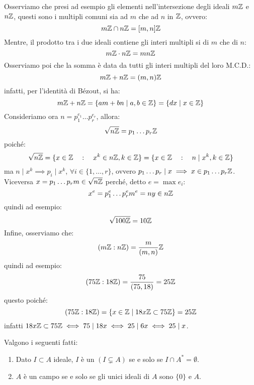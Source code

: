 \documentclass[11pt]{scrartcl}
\begin{document}
\begin{example}
    Osserviamo che presi ad esempio gli elementi nell'intersezione degli ideali $m\mathbb Z$ e $n\mathbb Z$, questi sono i multipli comuni sia ad $m$ che ad $n$ in $\mathbb Z$, ovvero:
        \[ m\mathbb Z \cap n\mathbb Z = [m,n]\mathbb Z
            \]
    Mentre, il prodotto tra i due ideali contiene gli interi multipli si di $m$ che di $n$:
        \[ m\mathbb Z \cdot n\mathbb Z = mn\mathbb Z
            \]
    Osserviamo poi che la somma è data da tutti gli interi multipli del loro M.C.D.:
        \[ m\mathbb Z + n\mathbb Z = (m,n)\mathbb Z
            \]
    infatti, per l'identità di Bézout, si ha:
        \[ m\mathbb Z + n\mathbb Z = \{am + bn \mid a,b \in \mathbb Z\} = \{dx \mid x \in \mathbb Z\}
            \]
    Consideriamo ora $n = p_1^{e_1} \ldots p_r^{e_r}$, allora:
        \[ \sqrt{n\mathbb Z} = p_1 \ldots p_r\mathbb Z
            \]
    poiché:
        \[ \sqrt{n\mathbb Z} = \{x \in \mathbb Z \quad : \quad x^k \in n\mathbb Z, k \in \mathbb Z\} = \{x \in \mathbb Z \quad : \quad n \mid x^k, k \in \mathbb Z\}
            \]
    ma $n \mid x^k \implies p_i \mid x^k$, $\forall i \in \{1,\ldots,r\}$, ovvero $p_1 \ldots p_r \mid x \implies x \in p_1\ldots p_r\mathbb Z$.
    Viceversa $x = p_1 \ldots p_r m \in \sqrt{n\mathbb Z}$ perché, detto $e = \max e_i$:
        \[ x^e = p_1^e \ldots p_r^e m^e = ny \in n\mathbb Z
            \]
    quindi ad esempio:
        \[ \sqrt{100\mathbb Z} = 10\mathbb Z
            \]
    Infine, osserviamo che:
        \[ (m\mathbb Z : n\mathbb Z) = \frac{m}{(m,n)}\mathbb Z
            \]
    quindi ad esempio:
        \[ (75\mathbb Z : 18\mathbb Z) = \frac{75}{(75,18)} = 25\mathbb Z
            \]
    questo poiché:
        \[ (75\mathbb Z : 18\mathbb Z) = \{x \in \mathbb Z \mid 18x \mathbb Z \subset 75\mathbb Z\} = 25\mathbb Z
            \]
    infatti $18x \mathbb Z \subset 75\mathbb Z \iff 75 \mid 18x \iff 25 \mid 6x \iff 25 \mid x$.
\end{example}

\newpage
\begin{proposition}
\label{2.26}
Valgono i seguenti fatti:
\begin{enumerate}[(1)]
    \item Dato $I \subset A$ ideale, $I$ è un  $(I \subsetneq A)$ se e solo se $I \cap A^* = \emptyset$.
    \item $A$ è un campo se e solo se gli unici ideali di $A$ sono $\{0\}$ e $A$.
\end{enumerate}
\end{proposition}
\end{document}
